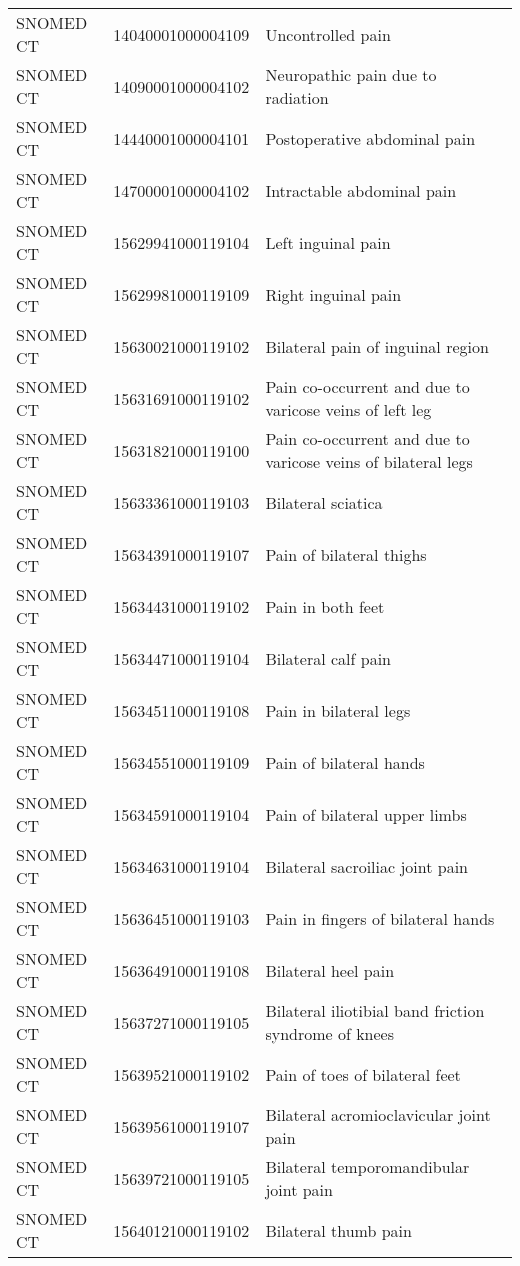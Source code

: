 \begin{longtable}{p{}p{}p{}}
  SNOMED CT & 14040001000004109 & Uncontrolled pain \\ 
  SNOMED CT & 14090001000004102 & Neuropathic pain due to radiation \\ 
  SNOMED CT & 14440001000004101 & Postoperative abdominal pain \\ 
  SNOMED CT & 14700001000004102 & Intractable abdominal pain \\ 
  SNOMED CT & 15629941000119104 & Left inguinal pain \\ 
  SNOMED CT & 15629981000119109 & Right inguinal pain \\ 
  SNOMED CT & 15630021000119102 & Bilateral pain of inguinal region \\ 
  SNOMED CT & 15631691000119102 & Pain co-occurrent and due to varicose veins of left leg \\ 
  SNOMED CT & 15631821000119100 & Pain co-occurrent and due to varicose veins of bilateral legs \\ 
  SNOMED CT & 15633361000119103 & Bilateral sciatica \\ 
  SNOMED CT & 15634391000119107 & Pain of bilateral thighs \\ 
  SNOMED CT & 15634431000119102 & Pain in both feet \\ 
  SNOMED CT & 15634471000119104 & Bilateral calf pain \\ 
  SNOMED CT & 15634511000119108 & Pain in bilateral legs \\ 
  SNOMED CT & 15634551000119109 & Pain of bilateral hands \\ 
  SNOMED CT & 15634591000119104 & Pain of bilateral upper limbs \\ 
  SNOMED CT & 15634631000119104 & Bilateral sacroiliac joint pain \\ 
  SNOMED CT & 15636451000119103 & Pain in fingers of bilateral hands \\ 
  SNOMED CT & 15636491000119108 & Bilateral heel pain \\ 
  SNOMED CT & 15637271000119105 & Bilateral iliotibial band friction syndrome of knees \\ 
  SNOMED CT & 15639521000119102 & Pain of toes of bilateral feet \\ 
  SNOMED CT & 15639561000119107 & Bilateral acromioclavicular joint pain \\ 
  SNOMED CT & 15639721000119105 & Bilateral temporomandibular joint pain \\ 
  SNOMED CT & 15640121000119102 & Bilateral thumb pain \\ 

\end{longtable}
